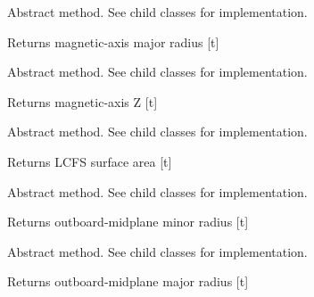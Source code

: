 \documentclass[letterpaper,10pt,english]{sphinxmanual}
\begin{document}
\begin{fulllineitems}
\begin{fulllineitems}
\label{eqtools:eqtools.core.Equilibrium.getMagR}
Abstract method.  See child classes for implementation.

Returns magnetic-axis major radius {[}t{]}

\end{fulllineitems}


\begin{fulllineitems}
\label{eqtools:eqtools.core.Equilibrium.getMagZ}
Abstract method.  See child classes for implementation.

Returns magnetic-axis Z {[}t{]}

\end{fulllineitems}


\begin{fulllineitems}
\label{eqtools:eqtools.core.Equilibrium.getAreaLCFS}
Abstract method.  See child classes for implementation.

Returns LCFS surface area {[}t{]}

\end{fulllineitems}


\begin{fulllineitems}
\label{eqtools:eqtools.core.Equilibrium.getAOut}
Abstract method.  See child classes for implementation.

Returns outboard-midplane minor radius {[}t{]}

\end{fulllineitems}


\begin{fulllineitems}
\label{eqtools:eqtools.core.Equilibrium.getRmidOut}
Abstract method.  See child classes for implementation.

Returns outboard-midplane major radius {[}t{]}

\end{fulllineitems}


\end{fulllineitems}
\end{document}
